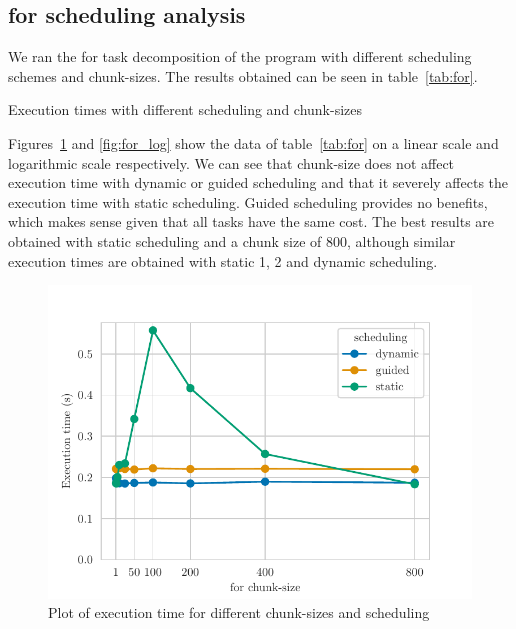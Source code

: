 \pagebreak
\subsection{for scheduling analysis}

We ran the for task decomposition of the program with different scheduling schemes and chunk-sizes. The
results obtained can be seen in table~\ref{tab:for}.

\begin{table}[H]
    \caption{Execution times with different scheduling and chunk-sizes}%
    \label{tab:for}
    \begin{center}
    
    \end{center}
\end{table}

Figures~\ref{fig:for} and \ref{fig:for_log} show the data of table~\ref{tab:for} on a linear scale and logarithmic
scale respectively. We can see that chunk-size does not affect execution time with dynamic or guided scheduling
and that it severely affects the execution time with static scheduling. Guided scheduling provides no benefits, which
makes sense given that all tasks have the same cost. The best results are obtained with static scheduling and
a chunk size of 800, although similar execution times are obtained with static 1, 2 and dynamic scheduling.


\begin{figure}[H]
    \centering
    \includegraphics{plots/for-scheduling.pdf}
    \caption{Plot of execution time for different chunk-sizes and scheduling}
    \label{fig:for} 
\end{figure}

